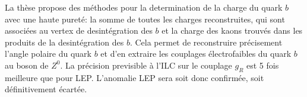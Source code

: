 La thèse propose des méthodes pour la determination de la charge du quark $b$ avec une haute pureté: la somme de toutes les charges reconstruites, qui sont associées au vertex de desintégration des $b$ et la charge des kaons trouvés dans les produits de la desintégration des $b$. 
Cela permet de reconstruire précisement l'angle polaire du quark $b$ et d'en extraire les couplages électrofaibles du quark $b$ au boson de $Z^0$. %
La précision previsible à l'ILC sur le couplage $g_R$ est 5 fois meilleure que pour LEP. L'anomalie LEP sera soit donc confirmée, soit définitivement écartée.



